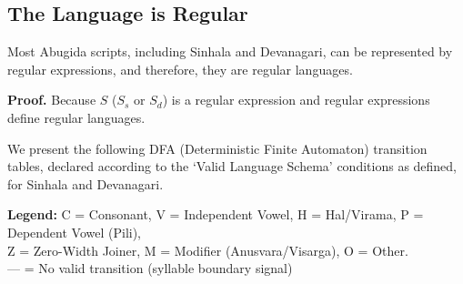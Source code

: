 \subsection{The Language is Regular}
\begin{proposition}
Most Abugida scripts, including Sinhala and Devanagari, can be represented by regular expressions, and therefore, they are regular languages.
\end{proposition}

\textbf{Proof.} Because $S$ ($S_s$ or $S_d$) is a regular expression and regular expressions define regular languages. 

We present the following DFA (Deterministic Finite Automaton) transition tables, declared according to the `Valid Language Schema' conditions as defined, for Sinhala and Devanagari.

\begin{table}[H]
\centering
\caption{DFA Transition Table for Sinhala Syllable Recognition}
\label{tab:sinhala_dfa}

\vspace{2mm}
\begin{center}
\small
\textbf{Legend:} C = Consonant, V = Independent Vowel, H = Hal/Virama, P = Dependent Vowel (Pili), \\
Z = Zero-Width Joiner, M = Modifier (Anusvara/Visarga), O = Other. \\
--- = No valid transition (syllable boundary signal) 
\end{center}
\end{table}

